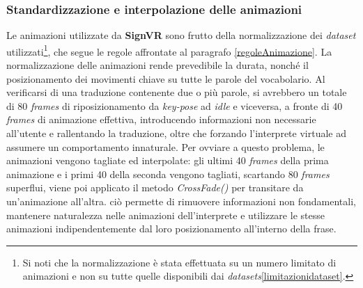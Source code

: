\documentclass[12pt, a4paper]{article}
\begin{document}
        \subsubsection{Standardizzazione e interpolazione delle animazioni}
        Le animazioni utilizzate da \textbf{SignVR} sono frutto della normalizzazione dei 
        \textit{dataset} utilizzati\footnote{Si noti che la normalizzazione è stata 
        effettuata su un numero limitato di animazioni e non su tutte quelle disponibili 
        dai \textit{datasets}\ref{limitazionidataset}.}, 
        che segue le regole affrontate al paragrafo \ref{regoleAnimazione}.
        La normalizzazione delle animazioni rende prevedibile la durata, nonché il 
        posizionamento dei movimenti chiave su tutte le parole del vocabolario.
        Al verificarsi di una traduzione contenente due o più parole, si avrebbero un 
        totale di 80 \textit{frames} di riposizionamento da \textit{key-pose} ad 
        \textit{idle} e viceversa, a fronte di 40 \textit{frames} di animazione effettiva, 
        introducendo
        informazioni non necessarie all'utente e rallentando la traduzione, oltre che 
        forzando l'interprete virtuale ad assumere un comportamento innaturale.
        Per ovviare a questo problema, le animazioni vengono tagliate ed interpolate: gli ultimi 40 
        \textit{frames} della prima animazione e i primi 40 della seconda vengono tagliati, scartando 80
        \textit{frames} superflui, viene poi applicato il metodo \textit{CrossFade()} per transitare da un'animazione all'altra.
        ciò permette di rimuovere informazioni non fondamentali, 
        mantenere naturalezza nelle animazioni dell'interprete e
        utilizzare le stesse animazioni indipendentemente dal loro posizionamento 
        all'interno della frase.
\end{document}
